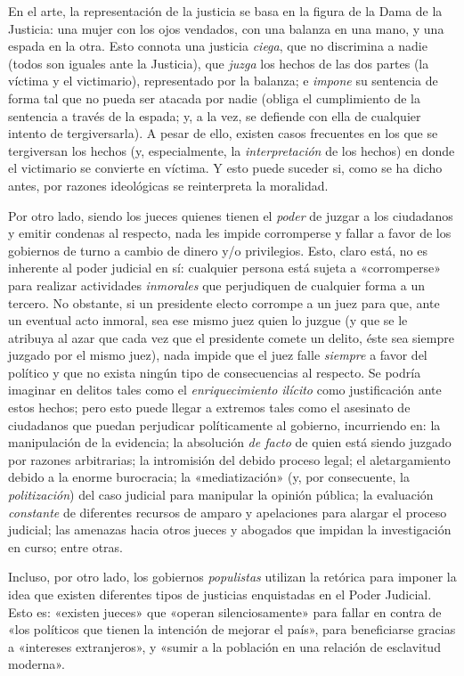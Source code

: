 \documentclass[12pt,a4paper,twoside]{book}
\begin{document}
En el arte, la representación de la justicia se basa en la figura de la Dama de la Justicia: una mujer con los ojos vendados, con una balanza en una mano, y una espada en la otra. Esto connota una justicia \textit{ciega}, que no discrimina a nadie (todos son iguales ante la Justicia), que \textit{juzga} los hechos de las dos partes (la víctima y el victimario), representado por la balanza; e \textit{impone} su sentencia de forma tal que no pueda ser atacada por nadie (obliga el cumplimiento de la sentencia a través de la espada; y, a la vez, se defiende con ella de cualquier intento de tergiversarla). A pesar de ello, existen casos frecuentes en los que se tergiversan los hechos (y, especialmente, la \textit{interpretación} de los hechos) en donde el victimario se convierte en víctima. Y esto puede suceder si, como se ha dicho antes, por razones ideológicas se reinterpreta la moralidad.

Por otro lado, siendo los jueces quienes tienen el \textit{poder} de juzgar a los ciudadanos y emitir condenas al respecto, nada les impide corromperse y fallar a favor de los gobiernos de turno a cambio de dinero y/o privilegios. Esto, claro está, no es inherente al poder judicial en sí: cualquier persona está sujeta a «corromperse» para realizar actividades \textit{inmorales} que perjudiquen de cualquier forma a un tercero. No obstante, si un presidente electo corrompe a un juez para que, ante un eventual acto inmoral, sea ese mismo juez quien lo juzgue (y que se le atribuya al azar que cada vez que el presidente comete un delito, éste sea siempre juzgado por el mismo juez), nada impide que el juez falle \textit{siempre} a favor del político y que no exista ningún tipo de consecuencias al respecto. Se podría imaginar en delitos tales como el \textit{enriquecimiento ilícito} como justificación ante estos hechos; pero esto puede llegar a extremos tales como el asesinato de ciudadanos que puedan perjudicar políticamente al gobierno, incurriendo en: la manipulación de la evidencia; la absolución \textit{de facto} de quien está siendo juzgado por razones arbitrarias; la intromisión del debido proceso legal; el aletargamiento debido a la enorme burocracia; la «mediatización» (y, por consecuente, la \textit{politización}) del caso judicial para manipular la opinión pública; la evaluación \textit{constante} de diferentes recursos de amparo y apelaciones para alargar el proceso judicial; las amenazas hacia otros jueces y abogados que impidan la investigación en curso; entre otras.

Incluso, por otro lado, los gobiernos \textit{populistas} utilizan la retórica para imponer la idea que existen diferentes tipos de justicias enquistadas en el Poder Judicial. Esto es: «existen jueces» que «operan silenciosamente» para fallar en contra de «los políticos que tienen la intención de mejorar el país», para beneficiarse gracias a «intereses extranjeros», y «sumir a la población en una relación de esclavitud moderna».
\end{document}
